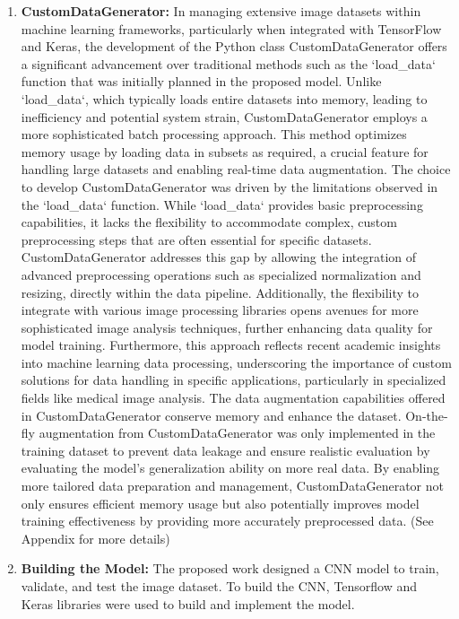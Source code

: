 \documentclass[10pt,twocolumn]{article}
\begin{document}
\begin{enumerate}
    \newline
    \item \textbf{CustomDataGenerator:} In managing extensive image datasets within machine learning frameworks, particularly when integrated with TensorFlow and Keras, the development of the Python class CustomDataGenerator offers a significant advancement over traditional methods such as the `load\_data` function that was initially planned in the proposed model. Unlike `load\_data`, which typically loads entire datasets into memory, leading to inefficiency and potential system strain, CustomDataGenerator employs a more sophisticated batch processing approach. This method optimizes memory usage by loading data in subsets as required, a crucial feature for handling large datasets and enabling real-time data augmentation. \newline \newline The choice to develop CustomDataGenerator was driven by the limitations observed in the `load\_data` function. While `load\_data` provides basic preprocessing capabilities, it lacks the flexibility to accommodate complex, custom preprocessing steps that are often essential for specific datasets. CustomDataGenerator addresses this gap by allowing the integration of advanced preprocessing operations such as specialized normalization and resizing, directly within the data pipeline. Additionally, the flexibility to integrate with various image processing libraries opens avenues for more sophisticated image analysis techniques, further enhancing data quality for model training. \newline \newline Furthermore, this approach reflects recent academic insights into machine learning data processing, underscoring the importance of custom solutions for data handling in specific applications, particularly in specialized fields like medical image analysis. The data augmentation capabilities offered in CustomDataGenerator conserve memory and enhance the dataset. On-the-fly augmentation from CustomDataGenerator was only implemented in the training dataset to prevent data leakage and ensure realistic evaluation by evaluating the model’s generalization ability on more real data. By enabling more tailored data preparation and management, CustomDataGenerator not only ensures efficient memory usage but also potentially improves model training effectiveness by providing more accurately preprocessed data. (See Appendix for more details)
    \newline
    \item \textbf {Building the Model:} The proposed work designed a CNN model to train, validate, and test the image dataset. To build the CNN, Tensorflow and Keras libraries were used to build and implement the model. \newline

\end{enumerate}
\end{document}
